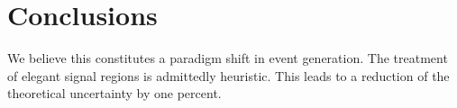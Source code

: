 \section{Conclusions}\label{sec:conclusions}

We believe this constitutes a paradigm shift in event generation. The
treatment of elegant signal regions is admittedly heuristic. This leads
to a reduction of the theoretical uncertainty by one percent.

